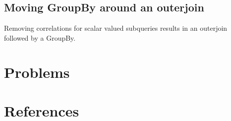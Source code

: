 \documentclass[11pt]{article}
\begin{document}
\subsection{Moving GroupBy around an outerjoin}
\label{sec:org5c2ce2e}
Removing correlations for scalar valued subqueries results in an outerjoin followed by a GroupBy.
\section{Problems}
\label{sec:orge6cf44d}


\section{References}
\label{sec:org58f5545}
\label{bibliographystyle link}



\end{document}
